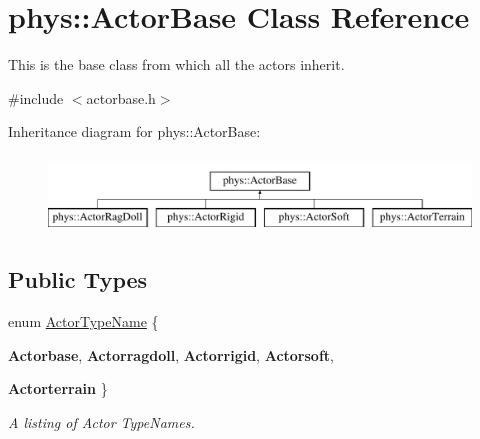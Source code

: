 \hypertarget{classphys_1_1ActorBase}{
\section{phys::ActorBase Class Reference}
\label{d8/d0f/classphys_1_1ActorBase}
}


This is the base class from which all the actors inherit.  




{\ttfamily \#include $<$actorbase.h$>$}

Inheritance diagram for phys::ActorBase:\begin{figure}[H]
\begin{center}
\leavevmode
\includegraphics[height=2cm]{d8/d0f/classphys_1_1ActorBase}
\end{center}
\end{figure}
\subsection*{Public Types}
\begin{DoxyCompactItemize}
\item 
enum \hyperlink{classphys_1_1ActorBase_aff3a7c464e8ce82576073f8f891434b7}{ActorTypeName} \{ \par
{\bfseries Actorbase}, 
{\bfseries Actorragdoll}, 
{\bfseries Actorrigid}, 
{\bfseries Actorsoft}, 
\par
{\bfseries Actorterrain}
 \}
\begin{DoxyCompactList}\small\item\em A listing of Actor TypeNames. \item\end{DoxyCompactList}\end{DoxyCompactItemize}
